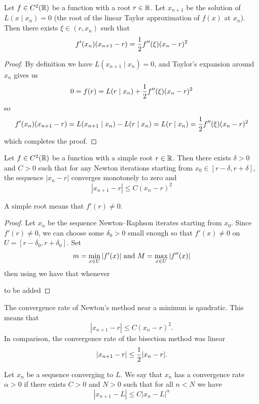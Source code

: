 \documentclass[11pt,a4paper]{article}
\begin{document}
\begin{lemma}
  \label{lem:newton-local}
  Let $f \in C^2(\mathbb{R})$ be a function with a root $r \in \mathbb{R}$.
  Let $x_{n + 1}$ be the solution of $L(x \mid x_n) = 0$
  (the root of the linear Taylor approximation of $f(x)$ at $x_n$).
  Then there exists $\xi \in (r,x_n)$ such that
  \[
    f'(x_n)(x_{n+1} - r) = \frac{1}{2} f''(\xi)(x_n - r)^2
  \]
\end{lemma}
\begin{proof}
  By definition we have $L(x_{n + 1} \mid x_n) = 0$, and Taylor's expansion
  around $x_n$ gives us
  \[
    0 = f(r) = L(r \mid x_n) + \frac{1}{2} f''(\xi)(x_n - r)^2
  \]
  so
  \[
    f'(x_n)(x_{n+1} - r) = L(x_{n + 1} \mid x_n) - L(r \mid x_n) =
    L(r \mid x_n) = \frac{1}{2} f''(\xi)(x_n - r)^2
  \]
  which completes the proof.
\end{proof}

\begin{proposition}
  Let $f \in C^2(\mathbb{R})$ be a function with a simple root $r \in \mathbb{R}$.
  Then there exists $\delta > 0$ and $C > 0$ such that for any Newton
  iterations starting from $x_0 \in [r - \delta, r + \delta]$, the
  sequence $|x_n - r|$ converges monotonely to zero and
  \[
    |x_{n  + 1} - r| \le C(x_n - r)^2
  \]
\end{proposition}
\begin{remark}
  A simple root means that $f'(r) \neq 0$.
\end{remark}
\begin{proof}
  Let $x_n$ be the sequence Newton--Raphson iterates starting from $x_0$.
  Since $f'(r) \neq 0$, we can choose some $\delta_0 > 0$ small enough so
  that $f'(x) \neq 0$ on $U = [r - \delta_0, r + \delta_0]$.
  Set
  \[
    m = \min_{x \in U} |f'(x)| \text{ and } M = \max_{x \in U} |f''(x)|
  \]
  then using  we have that whenever 
  
  to be added
\end{proof}

\begin{remark}
  The convergence rate of Newton's method near a minimun is qaudratic.
  This means that
  \[
    |x_{n + 1} - r| \le C (x_n - r)^2.
  \]
  In comparison, the convergence rate of the bisection method was linear
  \[
    |x_{n + 1} - r| \le \frac{1}{2} |x_n - r|.
  \]
\end{remark}

\begin{definition}
  Let $x_n$ be a sequence converging to $L$.
  We say that $x_n$ has a convergence rate $\alpha > 0$ if there exists
  $C > 0$ and $N > 0$ such that for all $n < N$ we have
  \[
    |x_{n + 1} - L| \le C |x_n - L|^{\alpha}
  \]
\end{definition}
\end{document}
